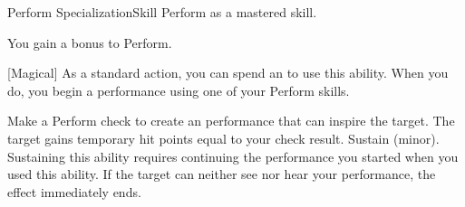     \begin{feat}{Perform Specialization}{Skill}
        \featpre Perform as a mastered skill.
        \featben

         You gain a  bonus to Perform.

        [Magical] As a standard action, you can spend an  to use this ability.
        When you do, you begin a performance using one of your Perform skills.
        \begin{ability}
            \begin{spelltargetinginfo}
            \end{spelltargetinginfo}
            \begin{spelleffects}
                \spelleffect Make a Perform check to create an performance that can inspire the target.
                The target gains temporary hit points equal to your check result.
                \spelldur Sustain (minor). Sustaining this ability requires continuing the performance you started when you used this ability. If the target can neither see nor hear your performance, the effect immediately ends.
            \end{spelleffects}
        \end{ability}


\end{feat}
